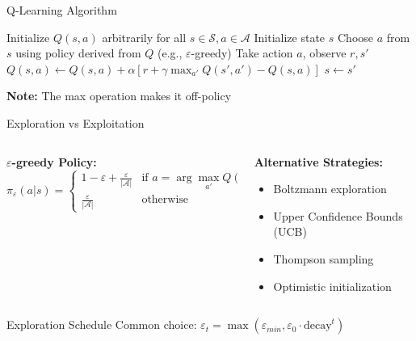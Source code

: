 \documentclass[aspectratio=169,10pt]{beamer}
\begin{document}
\begin{frame}[fragile]{Q-Learning Algorithm}
\begin{algorithm}[H]
\caption{Tabular Q-Learning}
\begin{algorithmic}[1]
\STATE Initialize $Q(s,a)$ arbitrarily for all $s \in \mathcal{S}, a \in \mathcal{A}$
    \STATE Initialize state $s$
        \STATE Choose $a$ from $s$ using policy derived from $Q$ (e.g., $\varepsilon$-greedy)
        \STATE Take action $a$, observe $r, s'$
        \STATE $Q(s,a) \leftarrow Q(s,a) + \alpha[r + \gamma \max_{a'} Q(s',a') - Q(s,a)]$
        \STATE $s \leftarrow s'$
    \ENDWHILE
\ENDFOR
\end{algorithmic}
\end{algorithm}

\textbf{Note:} The max operation makes it off-policy
\end{frame}

\begin{frame}{Exploration vs Exploitation}
\begin{columns}[T]
\begin{column}{0.5\textwidth}
\textbf{$\varepsilon$-greedy Policy:}
$$\pi_\varepsilon(a|s) = \begin{cases}
1-\varepsilon + \frac{\varepsilon}{|\mathcal{A}|} & \text{if } a = \arg\max_{a'} Q(s,a') \\
\frac{\varepsilon}{|\mathcal{A}|} & \text{otherwise}
\end{cases}$$
\end{column}
\begin{column}{0.5\textwidth}
\textbf{Alternative Strategies:}
\begin{itemize}
    \item Boltzmann exploration
    \item Upper Confidence Bounds (UCB)
    \item Thompson sampling
    \item Optimistic initialization
\end{itemize}
\end{column}
\end{columns}

\vspace{1em}
\begin{block}{Exploration Schedule}
Common choice: $\varepsilon_t = \max(\varepsilon_{min}, \varepsilon_0 \cdot \text{decay}^t)$
\end{block}
\end{frame}
\end{document}
